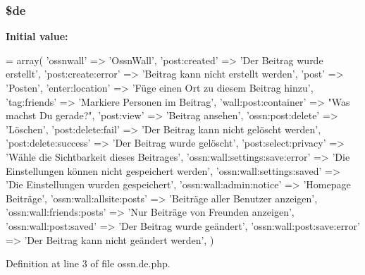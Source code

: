 \subsubsection[{\texorpdfstring{\$de}{$de}}]{\setlength{\rightskip}{0pt plus 5cm}\$de}\hypertarget{components_2_ossn_wall_2locale_2ossn_8de_8php_aab7de7e51b4580005f63dd4cf5e17311}{}\label{components_2_ossn_wall_2locale_2ossn_8de_8php_aab7de7e51b4580005f63dd4cf5e17311}
{\bfseries Initial value\+:}
\begin{DoxyCode}
= array(
        \textcolor{stringliteral}{'ossnwall'} => \textcolor{stringliteral}{'OssnWall'},
        \textcolor{stringliteral}{'post:created'} => \textcolor{stringliteral}{'Der Beitrag wurde erstellt'},
        \textcolor{stringliteral}{'post:create:error'} => \textcolor{stringliteral}{'Beitrag kann nicht erstellt werden'},
        \textcolor{stringliteral}{'post'} => \textcolor{stringliteral}{'Posten'},
        \textcolor{stringliteral}{'enter:location'} => \textcolor{stringliteral}{'Füge einen Ort zu diesem Beitrag hinzu'},
        \textcolor{stringliteral}{'tag:friends'} => \textcolor{stringliteral}{'Markiere Personen im Beitrag'},
        \textcolor{stringliteral}{'wall:post:container'} => \textcolor{stringliteral}{"Was machst Du gerade?"},
        \textcolor{stringliteral}{'post:view'} => \textcolor{stringliteral}{'Beitrag ansehen'},
        \textcolor{stringliteral}{'ossn:post:delete'} => \textcolor{stringliteral}{'Löschen'},
        \textcolor{stringliteral}{'post:delete:fail'} => \textcolor{stringliteral}{'Der Beitrag kann nicht gelöscht werden'},
        \textcolor{stringliteral}{'post:delete:success'} => \textcolor{stringliteral}{'Der Beitrag wurde gelöscht'},
        \textcolor{stringliteral}{'post:select:privacy'} => \textcolor{stringliteral}{'Wähle die Sichtbarkeit dieses Beitrages'},
        \textcolor{stringliteral}{'ossn:wall:settings:save:error'} => \textcolor{stringliteral}{'Die Einstellungen können nicht gespeichert werden'},
        \textcolor{stringliteral}{'ossn:wall:settings:saved'} => \textcolor{stringliteral}{'Die Einstellungen wurden gespeichert'},
        \textcolor{stringliteral}{'ossn:wall:admin:notice'} => \textcolor{stringliteral}{'Homepage Beiträge'},
        \textcolor{stringliteral}{'ossn:wall:allsite:posts'} => \textcolor{stringliteral}{'Beiträge aller Benutzer anzeigen'},
        \textcolor{stringliteral}{'ossn:wall:friends:posts'} => \textcolor{stringliteral}{'Nur Beiträge von Freunden anzeigen'},
        \textcolor{stringliteral}{'ossn:wall:post:saved'} => \textcolor{stringliteral}{'Der Beitrag wurde geändert'},
        \textcolor{stringliteral}{'ossn:wall:post:save:error'} => \textcolor{stringliteral}{'Der Beitrag kann nicht geändert werden'},
)
\end{DoxyCode}


Definition at line 3 of file ossn.\+de.\+php.

